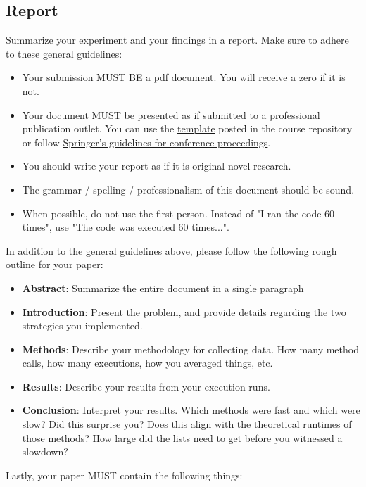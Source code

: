 \documentclass[paper=a4, fontsize=11pt, parskip=full]{scrartcl} %
\numberwithin{equation}{section} %
\numberwithin{figure}{section} %
\numberwithin{table}{section} %
\begin{document}
\subsection{Report}

Summarize your experiment and your findings in a report. Make sure to adhere to these general guidelines:

\begin{itemize}
	\item Your submission MUST BE a pdf document. You will receive a zero if it is not.
	\item Your document MUST be presented as if submitted to a professional publication outlet. You can use the \href{https://github.com/markfloryan/dsa1}{template} posted in the course repository or follow \href{https://www.springer.com/us/computer-science/lncs/conference-proceedings-guidelines}{Springer's guidelines for conference proceedings}.
	\item You should write your report as if it is original novel research.
	\item The grammar / spelling / professionalism of this document should be sound.
	\item When possible, do not use the first person. Instead of "I ran the code 60 times", use "The code was executed 60 times...".
\end{itemize}

In addition to the general guidelines above, please follow the following rough outline for your paper:

\begin{itemize}
	\item \textbf{Abstract}: Summarize the entire document in a single paragraph
	\item \textbf{Introduction}: Present the problem, and provide details regarding the two strategies you implemented.
	\item \textbf{Methods}: Describe your methodology for collecting data. How many method calls, how many executions, how you averaged things, etc.
	\item \textbf{Results}: Describe your results from your execution runs.
	\item \textbf{Conclusion}: Interpret your results. Which methods were fast and which were slow? Did this surprise you? Does this align with the theoretical runtimes of those methods? How large did the lists need to get before you witnessed a slowdown?
\end{itemize}

Lastly, your paper MUST contain the following things:
\end{document}
